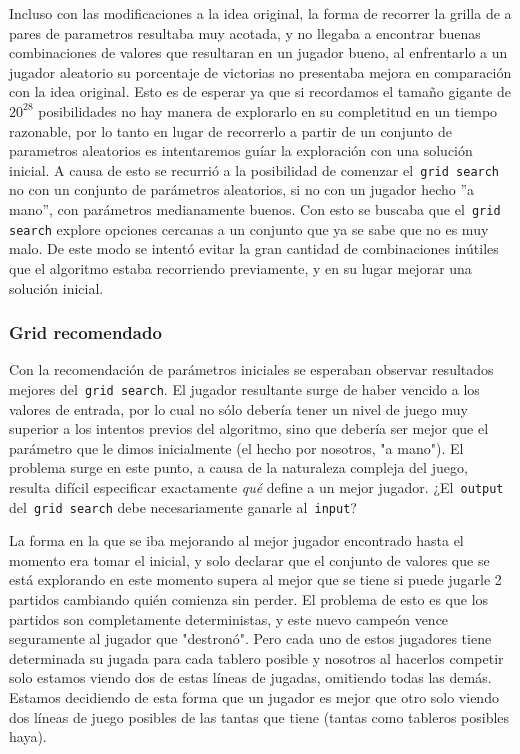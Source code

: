 \documentclass[A4paper,oneside,fleqn,11pt]{article}
\theoremstyle{definition}
\begin{document}
Incluso con las modificaciones a la idea original, la forma de recorrer la grilla de a pares de parametros resultaba muy acotada, y no llegaba a encontrar buenas combinaciones de valores que resultaran en un jugador bueno, al enfrentarlo a un jugador aleatorio su porcentaje de victorias no presentaba mejora en comparación con la idea original. Esto es de esperar ya que si recordamos el tamaño gigante de $ 20^{28}$ posibilidades no hay manera de explorarlo en su completitud en un tiempo razonable, por lo tanto en lugar de recorrerlo a partir de un conjunto de parametros aleatorios es intentaremos guíar la exploración con una solución inicial. A causa de esto se recurrió a la posibilidad de comenzar el\texttt{ grid search} no con un conjunto de parámetros aleatorios, si no con un jugador hecho ''a mano'', con parámetros medianamente buenos. Con esto se buscaba que el\texttt{ grid search} explore opciones cercanas a un conjunto que ya se sabe que no es muy malo. De este modo se intentó evitar la gran cantidad de combinaciones inútiles que el algoritmo estaba recorriendo previamente, y en su lugar mejorar una solución inicial.



\subsubsection{Grid recomendado}


Con la recomendación de parámetros iniciales se esperaban observar resultados mejores del\texttt{ grid search}. El jugador resultante surge de haber vencido a los valores de entrada, por lo cual no sólo debería tener un nivel de juego muy superior a los intentos previos del algoritmo, sino que debería ser mejor que el parámetro que le dimos inicialmente (el hecho por nosotros, "a mano"). El problema surge en este punto, a causa de la naturaleza compleja del juego, resulta difícil especificar exactamente \textit{qué} define a un mejor jugador. ¿El\texttt{ output} del\texttt{ grid search} debe necesariamente ganarle al\texttt{ input}? 

La forma en la que se iba mejorando al mejor jugador encontrado hasta el momento era tomar el inicial, y solo declarar que el conjunto de valores que se está explorando en este momento supera al mejor que se tiene si puede jugarle 2 partidos cambiando quién comienza sin perder. El problema de esto es que los partidos son completamente deterministas, y este nuevo campeón vence seguramente al jugador que "destronó". Pero cada uno de estos jugadores tiene determinada su jugada para cada tablero posible y nosotros al hacerlos competir solo estamos viendo dos de estas líneas de jugadas, omitiendo todas las demás. Estamos decidiendo de esta forma que un jugador es mejor que otro solo viendo dos líneas de juego posibles de las tantas que tiene (tantas como tableros posibles haya).
\end{document}
